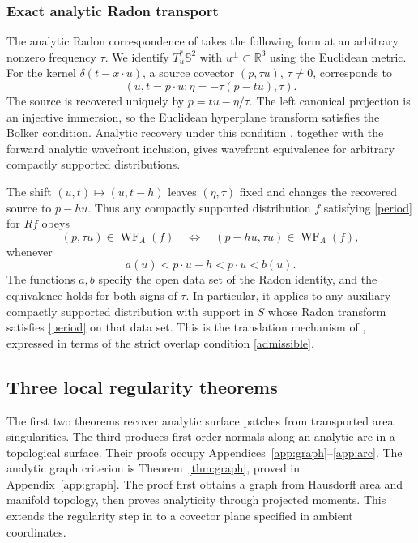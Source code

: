 \documentclass[11pt]{article}
\newcommand{\R}{\mathbb R}
\newcommand{\Sph}{\mathbb S}
\newcommand{\WF}{\operatorname{WF}_{A}}
\begin{document}
\subsubsection{Exact analytic Radon transport}
The analytic Radon correspondence of \cite[equation (7), p.~9]{GHL} takes the following form at an arbitrary nonzero frequency $\tau$. We identify $T_u^*\Sph^2$ with $u^\perp\subset\R^3$ using the Euclidean metric. For the kernel $\delta(t-x\cdot u)$, a source covector $(p,\tau u)$, $\tau\ne0$, corresponds to
\begin{equation}\label{canonical}
 (u,t=p\cdot u;\eta=-\tau(p-tu),\tau).
\end{equation}
The source is recovered uniquely by $p=tu-\eta/\tau$. The left canonical projection is an injective immersion, so the Euclidean hyperplane transform satisfies the Bolker condition. Analytic recovery under this condition \cite[Theorem 1.2]{MST}, together with the forward analytic wavefront inclusion, gives wavefront equivalence for arbitrary compactly supported distributions.

The shift $(u,t)\mapsto(u,t-h)$ leaves $(\eta,\tau)$ fixed and changes the recovered source to $p-hu$. Thus any compactly supported distribution $f$ satisfying \eqref{period} for $Rf$ obeys
\begin{equation}\label{transport}
 (p,\tau u)\in\WF(f)
 \quad\Longleftrightarrow\quad
 (p-hu,\tau u)\in\WF(f),
\end{equation}
whenever
\begin{equation}\label{admissible}
 a(u)<p\cdot u-h<p\cdot u<b(u).
\end{equation}
The functions $a,b$ specify the open data set of the Radon identity, and the equivalence holds for both signs of $\tau$. In particular, it applies to any auxiliary compactly supported distribution with support in $S$ whose Radon transform satisfies \eqref{period} on that data set. This is the translation mechanism of \cite[Lemma 5.5, p.~9]{GHL}, expressed in terms of the strict overlap condition \eqref{admissible}.

\subsection{Three local regularity theorems}
The first two theorems recover analytic surface patches from transported area singularities. The third produces first-order normals along an analytic arc in a topological surface. Their proofs occupy Appendices~\ref{app:graph}--\ref{app:arc}.
The analytic graph criterion is Theorem~\ref{thm:graph}, proved in Appendix~\ref{app:graph}.
The proof first obtains a graph from Hausdorff area and manifold topology, then proves analyticity through projected moments. This extends the regularity step in \cite[Lemma 5.4, p.~8]{GHL} to a covector plane specified in ambient coordinates.
\end{document}
